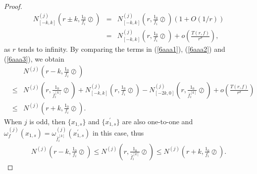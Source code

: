 \documentclass{article}
\begin{document}
\begin{proof}
    \begin{eqnarray*}
        N_{[-k, k]}^{(j)}\left(r\pm k, \frac{1_{0}}{f_{i}}\oslash\right)&=&
        N_{[-k, k]}^{(j)}\left(r, \frac{1_{0}}{f_{i}}\oslash\right)(1+O(1/r))\\
        &=&N_{[-k, k]}^{(j)}\left(r, \frac{1_{0}}{f_{i}}\oslash\right)+o\left(\frac{T(r, f)}{r^{\sigma}}\right),
    \end{eqnarray*}
    as $r$ tends to infinity. By comparing the terms in (\ref{6aaa1}), (\ref{6aaa2}) and (\ref{6aaa3}), we obtain
    \begin{eqnarray}\label{NN1}
        &&N^{(j)}\left(r-k, \frac{1_{0}}{f_{i}}\oslash\right)\nonumber\\
        &\leq& N^{(j)}\left(r, \frac{1_{0}}{\overline{f}_{i}^{[k]}}\oslash\right)+N_{[-k, k]}^{(j)}\left(r, \frac{1_{0}}{f_{i}}\oslash\right)-N_{[-2k, 0]}^{(j)}\left(r, \frac{1_{0}}{\overline{f}_{i}^{[k]}}\oslash\right)+o\left(\frac{T(r, f)}{r^{\sigma}}\right)\nonumber\\
        &\leq& N^{(j)}\left(r+k, \frac{1_{0}}{f_{i}}\oslash\right).
    \end{eqnarray}
    When $j$ is odd, then $\{x_{1,s}\}$ and $\{x_{1,s}^{'}\}$ are also one-to-one and $\omega_{f}^{(j)}(x_{1,s})=\omega_{\overline{f}_{i}^{[k]}}^{(j)}(x_{1,s}^{'})$ in this case, thus
    \begin{eqnarray}\label{NN2}
        N^{(j)}\left(r-k, \frac{1_{0}}{f_{i}}\oslash\right)\leq N^{(j)}\left(r, \frac{1_{0}}{\overline{f}_{i}^{[k]}}\oslash\right)\leq N^{(j)}\left(r+k, \frac{1_{0}}{f_{i}}\oslash\right).
    \end{eqnarray}
    

\end{proof}
\end{document}
